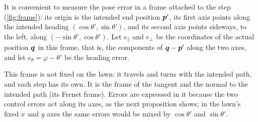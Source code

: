It is convenient to measure the pose error in a frame attached to the
step (\cref{fig:frame}): its origin is the intended end position $\bm{p}'$,
its first axis points along the intended heading
$(\cos\theta',\sin\theta')$, and its second axis points sideways, to the
left, along $(-\sin\theta',\cos\theta')$. Let $e_\parallel$ and $e_\perp$
be the coordinates of the actual position $\bm{q}$ in this frame, that is, the
components of $\bm{q}-\bm{p}'$ along the two axes, and let
$e_\theta=\varphi-\theta'$ be the heading error.

This frame is not fixed on the lawn: it travels and turns with the
intended path, and each step has its own. It is the frame of the tangent
and the normal to the intended path (its Frenet frame). Errors are
expressed in it because the two control errors act along its axes, as the
next proposition shows; in the lawn's fixed $x$ and $y$ axes the same
errors would be mixed by $\cos\theta'$ and $\sin\theta'$.

